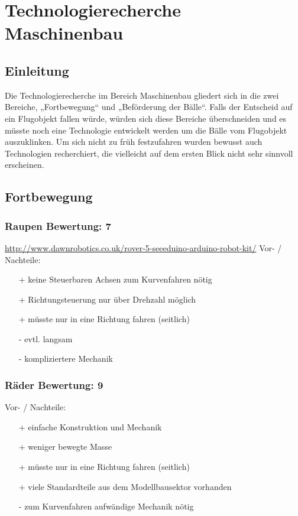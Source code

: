 \section{Technologierecherche Maschinenbau}

\subsection{Einleitung}
Die Technologierecherche im Bereich Maschinenbau gliedert sich in die zwei 
Bereiche, „Fortbewegung“ und  „Beförderung der Bälle“. Falls der Entscheid auf ein Flugobjekt fallen würde, würden sich diese Bereiche überschneiden und es müsste noch eine Technologie entwickelt werden um die Bälle vom Flugobjekt auszuklinken. Um sich nicht zu früh festzufahren wurden bewusst auch Technologien recherchiert, die vielleicht auf dem ersten Blick nicht sehr sinnvoll erscheinen.

\subsection{Fortbewegung}

\subsubsection{Raupen \hfill Bewertung: 7}
\url{http://www.dawnrobotics.co.uk/rover-5-seeeduino-arduino-robot-kit/}
Vor- / Nachteile:
\begin{itemize}
    \item[+] keine Steuerbaren Achsen zum Kurvenfahren nötig 
    \item[+] Richtungsteuerung nur über Drehzahl möglich
    \item[+] müsste nur in eine Richtung fahren (seitlich)
    \item[-] evtl. langsam
    \item[-] kompliziertere Mechanik
\end{itemize}

\subsubsection{Räder \hfill Bewertung: 9}
Vor- / Nachteile:
\begin{itemize}
    \item[+] einfache Konstruktion und Mechanik
    \item[+] weniger bewegte Masse
    \item[+] müsste nur in eine Richtung fahren (seitlich)
    \item[+] viele Standardteile aus dem Modellbausektor vorhanden
    \item[-] zum Kurvenfahren aufwändige Mechanik nötig
\end{itemize}

